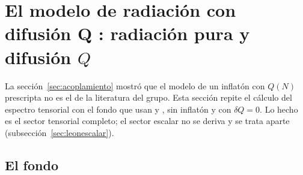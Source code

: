 \section{El modelo de radiación con difusión Q \cite{leon22,piccirilli23}: radiación pura y difusión $Q$}
\label{sec:leon}

La sección~\ref{sec:acoplamiento} mostró que el modelo de un inflatón con $Q(N)$ prescripta no es el de la literatura del grupo. Esta sección repite el cálculo del espectro tensorial con el fondo que usan \cite{leon22} y \cite{piccirilli23}, sin inflatón y con $\delta Q=0$. Lo hecho es el sector tensorial completo; el sector escalar no se deriva y se trata aparte (subsección~\ref{sec:leonescalar}).

\subsection{El fondo}
\label{sec:leonfondo}

